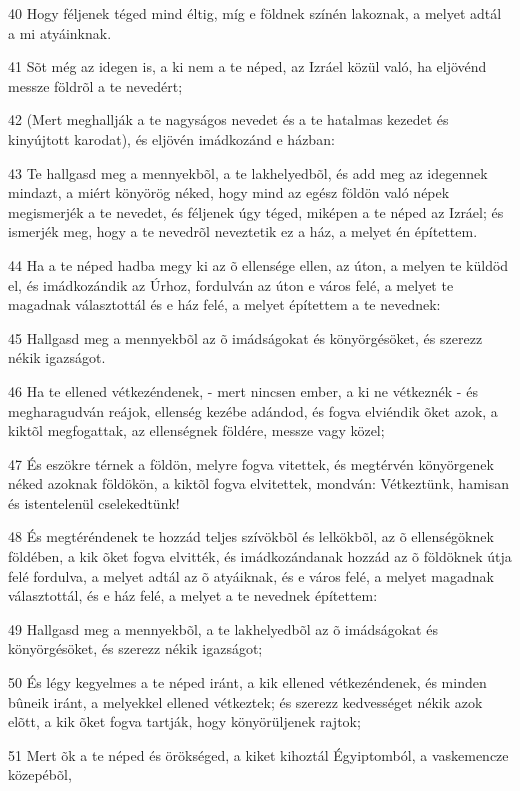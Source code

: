 \par 40 Hogy féljenek téged mind éltig, míg e földnek színén lakoznak, a melyet adtál a mi atyáinknak.
\par 41 Sõt még az idegen is, a ki nem a te néped, az Izráel közül való, ha eljövénd messze földrõl a te nevedért;
\par 42 (Mert meghallják a te nagyságos nevedet és a te hatalmas kezedet és kinyújtott karodat), és eljövén imádkozánd e házban:
\par 43 Te hallgasd meg a mennyekbõl, a te lakhelyedbõl, és add meg az idegennek mindazt, a miért könyörög néked, hogy mind az egész földön való népek megismerjék a te nevedet, és féljenek úgy téged, miképen a te néped az Izráel; és ismerjék meg, hogy a te nevedrõl neveztetik ez a ház, a melyet én építettem.
\par 44 Ha a te néped hadba megy ki az õ ellensége ellen, az úton, a melyen te küldöd el, és imádkozándik az Úrhoz, fordulván az úton e város felé, a melyet te magadnak választottál és e ház felé, a melyet építettem a te nevednek:
\par 45 Hallgasd meg a mennyekbõl az õ imádságokat és könyörgésöket, és szerezz nékik igazságot.
\par 46 Ha te ellened vétkezéndenek, - mert nincsen ember, a ki ne vétkeznék - és megharagudván reájok, ellenség kezébe adándod, és fogva elviéndik õket azok, a kiktõl megfogattak, az ellenségnek földére, messze vagy közel;
\par 47 És eszökre térnek a földön, melyre fogva vitettek, és megtérvén könyörgenek néked azoknak földökön, a kiktõl fogva elvitettek, mondván: Vétkeztünk, hamisan és istentelenül cselekedtünk!
\par 48 És megtéréndenek te hozzád teljes szívökbõl és lelkökbõl, az õ ellenségöknek földében, a kik õket fogva elvitték, és imádkozándanak hozzád az õ földöknek  útja felé fordulva, a melyet adtál az õ atyáiknak, és e város felé, a melyet magadnak választottál, és e ház felé, a melyet a te nevednek építettem:
\par 49 Hallgasd meg a mennyekbõl, a te lakhelyedbõl az õ imádságokat és könyörgésöket, és szerezz nékik igazságot;
\par 50 És légy kegyelmes a te néped iránt, a kik ellened vétkezéndenek, és minden bûneik iránt, a melyekkel ellened vétkeztek; és szerezz kedvességet nékik azok elõtt, a kik õket fogva tartják, hogy könyörüljenek rajtok;
\par 51 Mert õk a te néped és örökséged, a kiket kihoztál Égyiptomból, a vaskemencze közepébõl,
